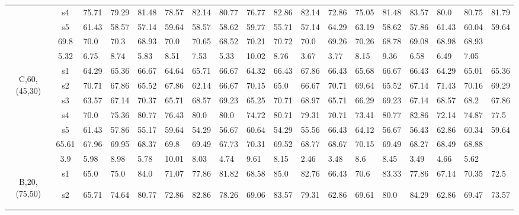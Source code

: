 \begin{table}[h]
{\begin{tabular}{cc|llll|llll|llll|llll}
 & s4 & 75.71 & 79.29 & 81.48 & 78.57 & 82.14 & 80.77 & 76.77 & 82.86 & 82.14 & 72.86 & 75.05 & 81.48 & 83.57 & 80.0 & 80.75 & 81.79 \\
 & s5 & 61.43 & 58.57 & 57.14 & 59.64 & 58.57 & 58.62 & 59.77 & 55.71 & 57.14 & 64.29 & 63.19 & 58.62 & 57.86 & 61.43 & 60.04 & 59.64 \\
\rowcolor{lightgray!50}\multicolumn{2}{r|}{avg} & 69.8 & 70.0 & 70.3 & 68.93 & 70.0 & 70.65 & 68.52 & 70.21 & 70.72 & 70.0 & 69.26 & 70.26 & 68.78 & 69.08 & 68.98 & 68.93 \\
\rowcolor{lightgray!50}\multicolumn{2}{r|}{std} & 5.32 & 6.75 & 8.74 & 5.83 & 8.51 & 7.53 & 5.33 & 10.02 & 8.76 & 3.67 & 3.77 & 8.15 & 9.36 & 6.58 & 6.49 & 7.05 \\
\multirow{6}{*}{\begin{sideways}C,60,(45,30)\end{sideways}} & s1 & 64.29 & 65.36 & 66.67 & 64.64 & 65.71 & 66.67 & 64.32 & 66.43 & 67.86 & 66.43 & 65.68 & 66.67 & 66.43 & 64.29 & 65.01 & 65.36 \\
 & s2 & 70.71 & 67.86 & 65.52 & 67.86 & 62.14 & 66.67 & 70.15 & 65.0 & 66.67 & 70.71 & 69.64 & 65.52 & 67.14 & 71.43 & 70.16 & 69.29 \\
 & s3 & 63.57 & 67.14 & 70.37 & 65.71 & 68.57 & 69.23 & 65.25 & 70.71 & 68.97 & 65.71 & 66.29 & 69.23 & 67.14 & 68.57 & 68.2 & 67.86 \\
 & s4 & 70.0 & 75.36 & 80.77 & 76.43 & 80.0 & 80.0 & 74.72 & 80.71 & 79.31 & 70.71 & 73.41 & 80.77 & 82.86 & 72.14 & 74.87 & 77.5 \\
 & s5 & 61.43 & 57.86 & 55.17 & 59.64 & 54.29 & 56.67 & 60.64 & 54.29 & 55.56 & 66.43 & 64.12 & 56.67 & 56.43 & 62.86 & 60.34 & 59.64 \\
\rowcolor{lightgray!50}\multicolumn{2}{r|}{avg} & 65.61 & 67.96 & 69.95 & 68.37 & 69.8 & 69.49 & 67.73 & 70.31 & 69.52 & 68.77 & 68.67 & 70.15 & 69.49 & 68.27 & 68.49 & 68.88 \\
\rowcolor{lightgray!50}\multicolumn{2}{r|}{std} & 3.9 & 5.98 & 8.98 & 5.78 & 10.01 & 8.03 & 4.74 & 9.61 & 8.15 & 2.46 & 3.48 & 8.6 & 8.45 & 3.49 & 4.66 & 5.62 \\
\multirow{6}{*}{\begin{sideways}B,20,(75,50)\end{sideways}} & s1 & 65.0 & 75.0 & 84.0 & 71.07 & 77.86 & 81.82 & 68.58 & 85.0 & 82.76 & 66.43 & 70.6 & 83.33 & 77.86 & 67.14 & 70.35 & 72.5 \\
 & s2 & 65.71 & 74.64 & 80.77 & 72.86 & 82.86 & 78.26 & 69.06 & 83.57 & 79.31 & 62.86 & 69.61 & 80.0 & 84.29 & 62.86 & 69.47 & 73.57 \\

\end{tabular}}
\end{table}
